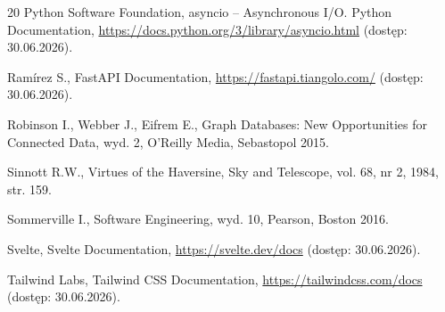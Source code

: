 \documentclass[twoside]{projektInzynierskiMS1z}
\begin{document}
\begin{thebibliography}{20}
 Python Software Foundation, asyncio -- Asynchronous I/O. Python Documentation, \url{https://docs.python.org/3/library/asyncio.html} (dostęp: 30.06.2026).

 Ramírez S., FastAPI Documentation, \url{https://fastapi.tiangolo.com/} (dostęp: 30.06.2026).

 Robinson I., Webber J., Eifrem E., Graph Databases: New Opportunities for Connected Data, wyd. 2, O'Reilly Media, Sebastopol 2015.

 Sinnott R.W., Virtues of the Haversine, Sky and Telescope, vol. 68, nr 2, 1984, str. 159.

 Sommerville I., Software Engineering, wyd. 10, Pearson, Boston 2016.

 Svelte, Svelte Documentation, \url{https://svelte.dev/docs} (dostęp: 30.06.2026).

 Tailwind Labs, Tailwind CSS Documentation, \url{https://tailwindcss.com/docs} (dostęp: 30.06.2026).

\end{thebibliography}
\end{document}
